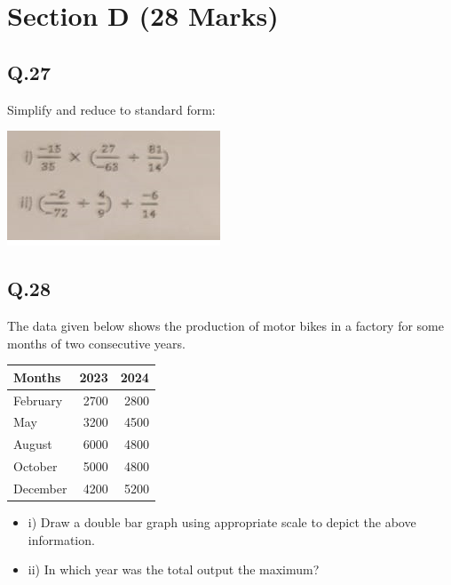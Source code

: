 \documentclass[11pt]{article}
\begin{document}
\section*{Section D (28 Marks)}
\label{sec:org3bc8f7a}

\subsection*{Q.27}
\label{sec:orge82bc73}
Simplify and reduce to standard form:
\begin{center}
\includegraphics[width=.9\linewidth]{./maths27.png}
\end{center}
\subsection*{Q.28}
\label{sec:org9279d7a}
The data given below shows the production of motor bikes in a factory for some months of two consecutive years.

\begin{center}
\begin{tabular}{lrr}
Months & 2023 & 2024\\
\hline
February & 2700 & 2800\\
May & 3200 & 4500\\
August & 6000 & 4800\\
October & 5000 & 4800\\
December & 4200 & 5200\\
\end{tabular}
\end{center}

\begin{itemize}
\item i) Draw a double bar graph using appropriate scale to depict the above information.
\item ii) In which year was the total output the maximum?
\end{itemize}
\end{document}
